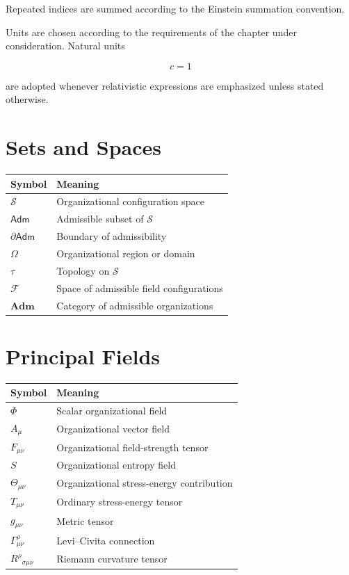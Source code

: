 \documentclass[11pt,oneside]{book}
\numberwithin{equation}{chapter}
\theoremstyle{definition}
\theoremstyle{plain}
\newcommand{\Adm}{\mathsf{Adm}}
\begin{document}
Repeated indices are summed according to the Einstein summation
convention.

Units are chosen according to the requirements of the chapter under
consideration. Natural units

\[
c=1
\]

are adopted whenever relativistic expressions are emphasized unless
stated otherwise.

\section{Sets and Spaces}

\begin{longtable}{ll}
\toprule
Symbol & Meaning\\
\midrule
$\mathcal S$ & Organizational configuration space\\
$\Adm$ & Admissible subset of $\mathcal S$\\
$\partial\Adm$ & Boundary of admissibility\\
$\Omega$ & Organizational region or domain\\
$\tau$ & Topology on $\mathcal S$\\
$\mathcal F$ & Space of admissible field configurations\\
$\mathbf{Adm}$ & Category of admissible organizations\\
\bottomrule
\end{longtable}

\section{Principal Fields}

\begin{longtable}{ll}
\toprule
Symbol & Meaning\\
\midrule
$\Phi$ & Scalar organizational field\\
$A_\mu$ & Organizational vector field\\
$F_{\mu\nu}$ & Organizational field-strength tensor\\
$S$ & Organizational entropy field\\
$\Theta_{\mu\nu}$ & Organizational stress-energy contribution\\
$T_{\mu\nu}$ & Ordinary stress-energy tensor\\
$g_{\mu\nu}$ & Metric tensor\\
$\Gamma^\rho_{\mu\nu}$ & Levi--Civita connection\\
$R^\rho{}_{\sigma\mu\nu}$ & Riemann curvature tensor\\
\bottomrule
\end{longtable}
\end{document}
